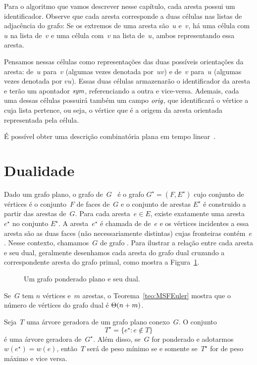 Para o algoritmo que vamos descrever nesse capítulo, cada aresta possui um identificador.
Observe que cada aresta corresponde a duas células nas listas de adjacência do grafo:
Se os extremos de uma aresta são~$u$ e~$v$, há uma célula com~$u$ na lista de~$v$ e uma célula com~$v$ na lista de~$u$, ambos representando essa aresta.

Pensamos nessas células como representações das duas possíveis orientações da aresta: de~$u$ para~$v$ (algumas vezes denotada por~$uv$) e de~$v$ para~$u$ (algumas vezes denotada por $vu$).
Essas duas células armazenarão o identificador da aresta e terão um apontador $\textit{sym}$, referenciando a outra e vice-versa.
Ademais, cada uma dessas células possuirá também um campo $\textit{orig}$, que identificará o vértice a cuja lista pertence, ou seja, o vértice que é a origem da aresta orientada representada pela célula.

É possível obter uma descrição combinatória plana em tempo linear~.

\section{Dualidade}
\label{sec:dualidade}


Dado um grafo plano, o grafo  de~$G$~\cite{planarTheoryAlgorith} é o grafo $G^\star = (F,E^\star)$ cujo conjunto de vértices é o conjunto~$F$ de faces de~$G$ e o conjunto de arestas $E^\star$ é construido a partir das arestas de~$G$.
Para cada aresta~$e\in E$, existe exatamente uma aresta~$e^\star$ no conjunto $E^\star$.
A aresta~$e^\star$ é chamada de  de~$e$ e os vértices incidentes a essa aresta são as duas faces (não necessariamente distintas) cujas fronteiras contém~$e$.
Nesse contexto, chamamos~$G$ de grafo .
Para ilustrar a relação entre cada aresta e seu dual, geralmente desenhamos cada aresta do grafo dual cruzando a correspondente aresta do grafo primal, como mostra a Figura~\ref{fig:MSF-basico-1}.

\begin{figure}[htb]
\scalebox{1.5}{
\centering

}
\caption{Um grafo ponderado plano e seu dual.}
\label{fig:MSF-basico-1}
\end{figure}


Se~$G$ tem $n$ vértices e~$m$ arestas, o Teorema~\ref{teo:MSFEuler} mostra que o número de vértices do grafo dual é $\Theta(n+m)$.

\begin{theorem}
\label{teo:MSFdual}
Seja~$T$ uma árvore geradora de um grafo plano conexo~$G$. O conjunto
$$
T^\star = \{e^\star:e\notin T\}
$$
é uma árvore geradora de~$G^\star$.
Além disso, se~$G$ for ponderado e adotarmos $w(e^\star) = w(e)$, então~$T$ será de peso mínimo se e somente se~$T^\star$ for de peso máximo e vice versa.
\end{theorem}


